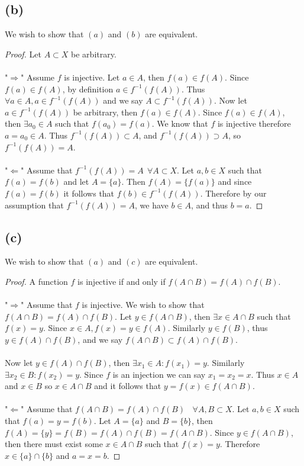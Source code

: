 \documentclass{article}
\begin{document}
\subsection*{(b)}
We wish to show that $(a)$ and $(b)$ are equivalent.
\begin{proof}
    Let $A \subset X$ be arbitrary.
    \\\\
    "$\Rightarrow$" Assume $f$ is injective.
    Let $a \in A$, then $f(a) \in f(A)$.
    Since $f(a) \in f(A)$, by definition $a \in f^{-1}(f(A))$.
    Thus $\forall a \in A, a \in f^{-1}(f(A))$ and we say $A \subset f^{-1}(f(A))$.
    Now let $a \in f^{-1}(f(A))$ be arbitrary, then $f(a) \in f(A)$.
    Since $f(a) \in f(A)$, then $\exists a_0 \in A$ such that $f(a_0) = f(a)$.
    We know that $f$ is injective therefore $a = a_0 \in A$.
    Thus $f^{-1}(f(A)) \subset A$, and $f^{-1}(f(A)) \supset A$, so $f^{-1}(f(A)) = A$.
    \\\\
    "$\Leftarrow$" Assume that $f^{-1}(f(A)) = A \ \ \forall A \subset X$.
    Let $a,b \in X$ such that $f(a) = f(b)$ and let $A = \{a\}$.
    Then $f(A) = \{f(a)\}$ and since $f(a) = f(b)$ it follows that $f(b) \in f^{-1}(f(A))$.
    Therefore by our assumption that $f^{-1}(f(A))=A$, we have $b \in A$, and thus $b=a$.
\end{proof}

\subsection*{(c)}
We wish to show that $(a)$ and $(c)$ are equivalent.
\begin{proof}
    A function $f$ is injective if and only if $f(A \cap B) = f(A) \cap f(B)$.
    \\\\
    "$\Rightarrow$" Assume that $f$ is injective.
    We wish to show that $f(A \cap B) = f(A) \cap f(B)$.
    Let $y \in f(A \cap B)$, then $\exists x \in A \cap B$ such that $f(x) = y$.
    Since $x \in A, f(x) = y \in f(A)$.
    Similarly $y \in f(B)$, thus $y \in f(A) \cap f(B)$, and we say $f(A \cap B) \subset f(A) \cap f(B)$.
    \\\\
    Now let $y \in f(A) \cap f(B)$, then $\exists x_1 \in A : f(x_1) = y$.
    Similarly $\exists x_2 \in B : f(x_2) = y$.
    Since $f$ is an injection we can say $x_1 = x_2 = x$.
    Thus $x \in A$ and $x \in B$ so $x \in A \cap B$ and it follows that $y = f(x) \in f(A \cap B)$.
    \\\\
    "$\Leftarrow$" Assume that $f(A \cap B) = f(A) \cap f(B) \ \ \ \ \forall A,B \subset X$.
    Let $a,b \in X$ such that $f(a) = y = f(b)$.
    Let $A = \{a\}$ and $B = \{b\}$, then $f(A) = \{y\} = f(B) = f(A) \cap f(B) = f(A \cap B)$.
    Since $y \in f(A \cap B)$, then there must exist some $x \in A \cap B$ such that $f(x) = y$.
    Therefore $x \in \{a\} \cap \{b\}$ and $a = x = b$.
\end{proof}
\end{document}
